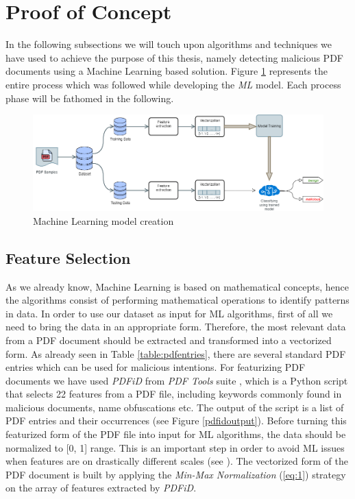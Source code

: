 \section{Proof of Concept}
\label{section:poc}

In the following subsections we will touch upon algorithms and techniques we have used to achieve the purpose of this thesis, namely detecting malicious PDF documents using a Machine Learning based solution. Figure \ref{mlsteps} represents the entire process which was followed while developing the \textit{ML} model. Each process phase will be fathomed in the following.

\begin{figure}[H]
	\centerline{\includegraphics[scale=0.5]{figures/ml.png}}  
	\caption{Machine Learning model creation}
	\label{mlsteps}
\end{figure}

\subsection{Feature Selection}
\label{subsection:featureSelection}
As we already know, Machine Learning is based on mathematical concepts, hence the algorithms consist of performing mathematical operations to identify patterns in data. In order to use our dataset as input for ML algorithms, first of all we need to bring the data in an appropriate form. Therefore, the most relevant data from a PDF document should be extracted and transformed into a vectorized form. As already seen in Table \ref{table:pdfentries}, there are several standard PDF entries which can be used for malicious intentions. For featurizing PDF documents we have used \textit{PDFiD} from \textit{PDF Tools} suite \cite{pdftools}, which is a Python script that selects 22 features from a PDF file, including keywords commonly found in malicious documents, name obfuscations etc. The output of the script is a list of PDF entries and their occurrences (see Figure \ref{pdfidoutput}). Before turning this featurized form of the PDF file into input for ML algorithms, the data should be normalized to [0, 1] range. This is an important step in order to avoid ML issues when features are on drastically different scales (see \cite{mlCookbook}). The vectorized form of the PDF document is built by applying the \textit{Min-Max Normalization} (\ref{eq:1}) strategy on the array of features extracted by \textit{PDFiD}.


